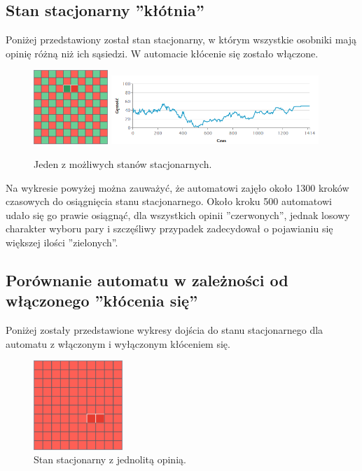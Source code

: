 \documentclass[12pt]{article}
\begin{document}
\subsection{Stan stacjonarny ''kłótnia''}

Poniżej przedstawiony został stan stacjonarny, w którym wszystkie osobniki mają opinię różną niż ich sąsiedzi. W automacie kłócenie się zostało włączone.

\begin{figure}[H]
\centering
\includegraphics[width=0.25\textwidth]{stacjonarny_klocenie.png} 
\includegraphics[width=0.7\textwidth]{stacjonarny_klocenie_wykres.png}
\caption{Jeden z możliwych stanów stacjonarnych. }
\end{figure}

Na wykresie powyżej można zauważyć, że automatowi zajęło około 1300 kroków czasowych do osiągnięcia stanu stacjonarnego. Około kroku 500 automatowi udało się go prawie osiągnąć, dla wszystkich opinii ''czerwonych'', jednak losowy charakter wyboru pary i szczęśliwy przypadek zadecydował o pojawianiu się większej ilości ''zielonych''.

\subsection{Porównanie automatu w zależności od włączonego ''kłócenia się''}

Poniżej zostały przedstawione wykresy dojścia do stanu stacjonarnego dla automatu z włączonym i wyłączonym kłóceniem się.

\begin{figure}[H]
\centering
\includegraphics[width=0.3\textwidth]{stacjonarny_niezgoda.png}
\caption{Stan stacjonarny z jednolitą opinią. }
\end{figure}
\end{document}
